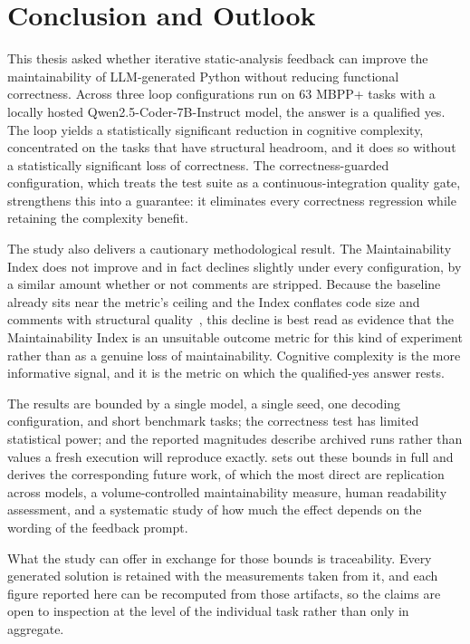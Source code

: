 
\section{Conclusion and Outlook}
\label{sec:conclusion}

This thesis asked whether iterative static-analysis feedback can improve the
maintainability of LLM-generated Python without reducing functional correctness.
Across three loop configurations run on 63 MBPP+ tasks with a locally hosted
Qwen2.5-Coder-7B-Instruct model, the answer is a qualified yes. The loop yields a
statistically significant reduction in cognitive complexity, concentrated on the
tasks that have structural headroom, and it does so without a statistically
significant loss of correctness. The correctness-guarded configuration, which
treats the test suite as a continuous-integration quality gate, strengthens this
into a guarantee: it eliminates every correctness regression while retaining the
complexity benefit.

The study also delivers a cautionary methodological result. The Maintainability
Index does not improve and in fact declines slightly under every configuration, by
a similar amount whether or not comments are stripped. Because the baseline already
sits near the metric's ceiling and the Index conflates code size and comments with
structural quality~\citep{heitlager2007maintainability}, this decline is best read as evidence that the
Maintainability Index is an unsuitable outcome metric for this kind of
experiment rather than as a genuine loss of maintainability. Cognitive complexity
is the more informative signal, and it is the metric on which the qualified-yes
answer rests.

The results are bounded by a single model, a single seed, one decoding
configuration, and short benchmark tasks; the correctness test has limited
statistical power; and the reported magnitudes describe archived runs rather than
values a fresh execution will reproduce exactly.  sets out
these bounds in full and derives the corresponding future work, of which the most
direct are replication across models, a volume-controlled maintainability measure,
human readability assessment, and a systematic study of how much the effect depends
on the wording of the feedback prompt.

What the study can offer in exchange for those bounds is traceability. Every
generated solution is retained with the measurements taken from it, and each figure
reported here can be recomputed from those artifacts, so the claims are open to
inspection at the level of the individual task rather than only in aggregate.
